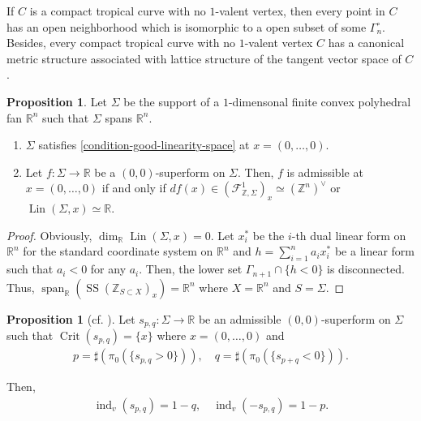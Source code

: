\documentclass[a4paper,dvipdfmx,reqno,12pt]{amsart}
\theoremstyle{definition}
\newtheorem{proposition}[theorem]{Proposition}
\newcommand{\opn}[1]{\operatorname{#1}}
\numberwithin{equation}{section}
\begin{document}
If $C$ is a compact tropical curve with 
no $1$-valent vertex, then every point in $C$ has 
an open neighborhood which is isomorphic to 
a open subset of some $\Gamma_{n}^{\circ}$.
Besides, every compact tropical curve with 
no $1$-valent vertex $C$ has a canonical metric structure 
associated with lattice structure of the tangent 
vector space of $C$ 
\cite[Proposition 3.6]{mikhalkinTropicalCurvesTheir2008a}.


\begin{proposition}
\label{proposition-admissible-curve}
Let $\Sigma$ be the support of a $1$-dimensonal 
finite convex polyhedral fan $\mathbb{R}^{n}$ such that
$\Sigma$ spans $\mathbb{R}^{n}$.
\begin{enumerate}
\item $\Sigma$ satisfies
\cref{condition-good-linearity-space} at $x=(0,\ldots,0)$.
\item Let $f\colon \Sigma\to \mathbb{R}$ be a 
$(0,0)$-superform on $\Sigma$. Then, 
$f$ is admissible at $x=(0,\ldots,0)$ if and only if 
$df(x)\in (\mathcal{F}^{1}_{\mathbb{Z},\Sigma})_x\simeq (\mathbb{Z}^{n})^{\vee}$
or $\opn{Lin}(\Sigma,x)\simeq \mathbb{R}$.
\end{enumerate}
\end{proposition}

\begin{proof}
Obviously, $\opn{dim}_{\mathbb{R}}\opn{Lin}(\Sigma,x)=0$.
Let $x_i^{*}$ be the $i$-th dual linear form on 
$\mathbb{R}^{n}$ for the standard coordinate system on 
$\mathbb{R}^{n}$ and 
$h=\sum_{i=1}^{n} a_i x^{*}_i$ be a linear form
such that $a_i<0$ for any $a_i$.
Then, the lower set $\Gamma_{n+1}\cap \{h< 0\}$ is disconnected.
Thus, 
$\opn{span}_{\mathbb{R}}(\opn{SS}(\mathbb{Z}_{S\subset X})_x)
=\mathbb{R}^{n}$ where $X=\mathbb{R}^{n}$ and $S=\Sigma$.
\end{proof}



\begin{proposition}[{cf. \cite{knill2012graph}}]
\label{proposition-n-valent}
Let $s_{p,q}\colon \Sigma\to \mathbb{R}$ be 
an admissible $(0,0)$-superform on $\Sigma$ 
such that $\opn{Crit}(s_{p,q})=\{x\}$ where
$x=(0,\ldots,0)$ and
\begin{align}
p=\sharp(\pi_0(\{s_{p,q}>0\})), \quad 
q=\sharp(\pi_0(\{s_{p+q}<0\})).
\end{align}

Then, 
\begin{align}
\opn{ind}_v(s_{p,q})=1-q ,\quad \opn{ind}_v(-s_{p,q})=1-p.
\end{align}

\end{proposition}
\end{document}
